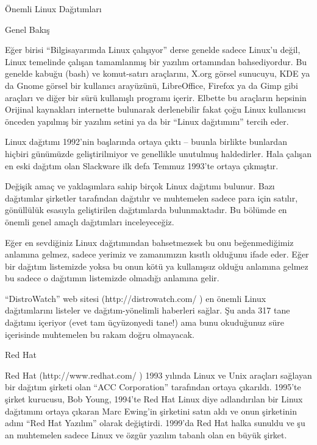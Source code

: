 \begin{section}{Önemli Linux Dağıtımları}
\begin{subsection}{Genel Bakış}

Eğer birisi “Bilgisayarımda Linux çalışıyor” derse genelde sadece Linux'u değil, Linux temelinde çalışan tamamlanmış bir yazılım ortamından bahsediyordur. Bu genelde kabuğu (bash) ve komut-satırı araçlarını, X.org görsel sunucuyu, KDE ya da Gnome görsel bir kullanıcı arayüzünü, LibreOffice, Firefox ya da Gimp gibi araçları ve diğer bir sürü kullanışlı programı içerir. Elbette bu araçların hepsinin Orijinal kaynakları internette bulunarak derlenebilir fakat çoğu Linux kullanıcısı önceden yapılmış bir yazılım setini ya da bir “Linux dağıtımını” tercih eder.

Linux dağıtımı 1992'nin başlarında ortaya çıktı -- buunla birlikte bunlardan hiçbiri günümüzde geliştirilmiyor ve genellikle unutulmuş haldedirler. Hala çalışan en eski dağıtım olan Slackware ilk defa Temmuz 1993'te ortaya çıkmıştır.

Değişik amaç ve yaklaşımlara sahip birçok Linux dağıtımı bulunur. Bazı dağıtımlar şirketler tarafından dağıtılır ve muhtemelen sadece para için satılır, gönüllülük esasıyla geliştirilen dağıtımlarda bulunmaktadır. Bu bölümde en önemli genel amaçlı dağıtımları inceleyeceğiz.

Eğer en sevdiğiniz Linux dağıtımından bahsetmezsek bu onu beğenmediğimiz anlamına gelmez, sadece yerimiz ve zamanımızın kısıtlı olduğunu ifade eder. Eğer bir dağıtım listemizde yoksa bu onun kötü ya kullanışsız olduğu anlamına gelmez bu sadece o dağıtımın listemizde olmadığı anlamına gelir.

“DistroWatch” web sitesi (http://distrowatch.com/ ) en önemli Linux dağıtımlarını listeler ve dağıtım-yönelimli haberleri sağlar. Şu anda 317 tane dağıtımı içeriyor (evet tam üçyüzonyedi tane!) ama bunu okuduğunuz süre içerisinde muhtemelen bu rakam doğru olmayacak.
\end{subsection}
\begin{subsection}{Red Hat}

Red Hat (http://www.redhat.com/ ) 1993 yılında Linux ve Unix araçları sağlayan bir dağıtım şirketi olan “ACC Corporation” tarafından ortaya çıkarıldı. 1995'te şirket kurucusu, Bob Young, 1994'te Red Hat Linux diye adlandırılan bir Linux dağıtımını ortaya çıkaran Marc Ewing'in şirketini satın aldı ve onun şirketinin adını “Red Hat Yazılım” olarak değiştirdi. 1999'da Red Hat halka sunuldu ve şu an muhtemelen sadece Linux ve özgür yazılım tabanlı olan en büyük şirket.


\end{subsection}
\end{section}

